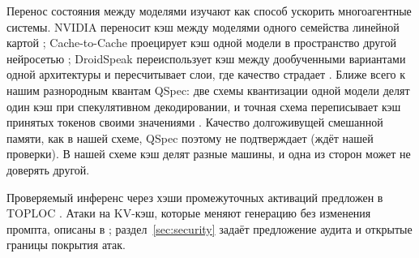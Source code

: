 Перенос состояния между моделями изучают как способ ускорить многоагентные системы. NVIDIA переносит кэш между
моделями одного семейства линейной картой \cite{heo2026crossmodel}; Cache-to-Cache проецирует кэш одной модели в
пространство другой нейросетью \cite{fu2025c2c}; DroidSpeak переиспользует кэш между дообученными вариантами одной
архитектуры и пересчитывает слои, где качество страдает \cite{liu2024droidspeak}. Ближе всего к нашим разнородным
квантам QSpec: две схемы квантизации одной модели делят один кэш при спекулятивном декодировании, и точная схема
переписывает кэш принятых токенов своими значениями \cite{zhao2024qspec}. Качество долгоживущей смешанной памяти,
как в нашей схеме, QSpec поэтому не подтверждает (ждёт нашей проверки). В нашей схеме кэш делят разные машины, и одна из сторон может не
доверять другой.

Проверяемый инференс через хэши промежуточных активаций предложен в TOPLOC \cite{ong2025toploc}. Атаки на KV-кэш,
которые меняют генерацию без изменения промпта, описаны в \cite{ganesh2025historyswap,zhu2026r2ecap,zhang2026hijackkv};
раздел~\ref{sec:security} задаёт предложение аудита и открытые границы покрытия атак.
